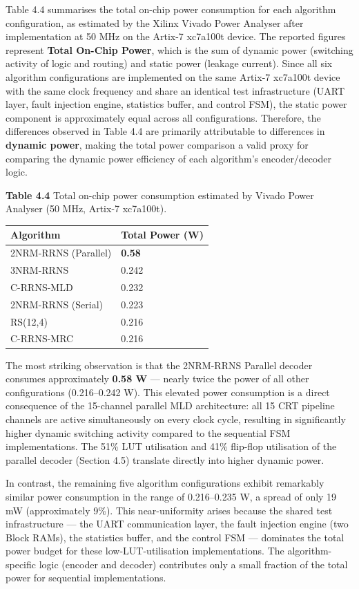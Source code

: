 \documentclass[
  12pt,
  a4paper]{report}
\newcounter{none} %
\begin{document}
Table 4.4 summarises the total on-chip power consumption for each
algorithm configuration, as estimated by the Xilinx Vivado Power
Analyser after implementation at 50 MHz on the Artix-7 xc7a100t device.
The reported figures represent \textbf{Total On-Chip Power}, which is
the sum of dynamic power (switching activity of logic and routing) and
static power (leakage current). Since all six algorithm configurations
are implemented on the same Artix-7 xc7a100t device with the same clock
frequency and share an identical test infrastructure (UART layer, fault
injection engine, statistics buffer, and control FSM), the static power
component is approximately equal across all configurations. Therefore,
the differences observed in Table 4.4 are primarily attributable to
differences in \textbf{dynamic power}, making the total power comparison
a valid proxy for comparing the dynamic power efficiency of each
algorithm's encoder/decoder logic.

\textbf{Table 4.4} Total on-chip power consumption estimated by Vivado
Power Analyser (50 MHz, Artix-7 xc7a100t).

{\def\LTcaptype{none} %
\begin{longtable}[]{@{}ll@{}}
\toprule\noalign{}
Algorithm & Total Power (W) \\
\midrule\noalign{}
\endhead
\bottomrule\noalign{}
\endlastfoot
2NRM-RRNS (Parallel) & \textbf{0.58} \\
3NRM-RRNS & 0.242 \\
C-RRNS-MLD & 0.232 \\
2NRM-RRNS (Serial) & 0.223 \\
RS(12,4) & 0.216 \\
C-RRNS-MRC & 0.216 \\
\end{longtable}
}

The most striking observation is that the 2NRM-RRNS Parallel decoder
consumes approximately \textbf{0.58 W} --- nearly twice the power of all
other configurations (0.216--0.242 W). This elevated power consumption
is a direct consequence of the 15-channel parallel MLD architecture: all
15 CRT pipeline channels are active simultaneously on every clock cycle,
resulting in significantly higher dynamic switching activity compared to
the sequential FSM implementations. The 51\% LUT utilisation and 41\%
flip-flop utilisation of the parallel decoder (Section 4.5) translate
directly into higher dynamic power.

In contrast, the remaining five algorithm configurations exhibit
remarkably similar power consumption in the range of 0.216--0.235 W, a
spread of only 19 mW (approximately 9\%). This near-uniformity arises
because the shared test infrastructure --- the UART communication layer,
the fault injection engine (two Block RAMs), the statistics buffer, and
the control FSM --- dominates the total power budget for these
low-LUT-utilisation implementations. The algorithm-specific logic
(encoder and decoder) contributes only a small fraction of the total
power for sequential implementations.
\end{document}
